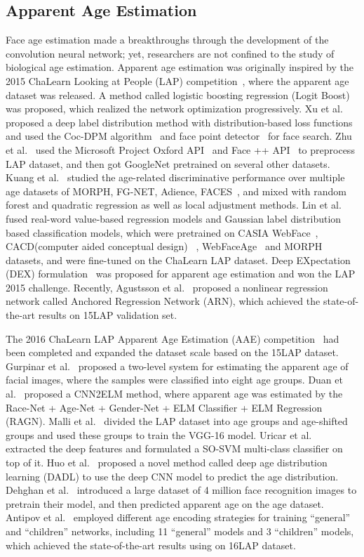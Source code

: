 \documentclass[journal]{IEEEtran}
\begin{document}
\subsection{Apparent Age Estimation}
Face age estimation made a breakthroughs through the development of the convolution neural network; yet, researchers are not confined to the study of biological age estimation. Apparent age estimation was originally inspired by the 2015 ChaLearn Looking at People (LAP) competition~\cite{ref-46}, where the apparent age dataset was released. A method called logistic boosting regression (Logit Boost)~\cite{ref-33} was proposed, which realized the network optimization progressively. Xu et al.~\cite{ref-34} proposed a deep label distribution method with distribution-based loss functions and used the Coc-DPM algorithm~\cite{ref-35} and face point detector~\cite{ref-36} for face search. Zhu et al.~\cite{ref-37} used the Microsoft Project Oxford API~\cite{ref-39} and Face ++ API~\cite{ref-38} to preprocess LAP dataset, and then got GoogleNet pretrained on several other datasets. Kuang et al.~\cite{ref-40} studied the age-related discriminative performance over multiple age datasets of MORPH, FG-NET, Adience, FACES~\cite{ref-41}, and mixed with random forest and quadratic regression as well as local adjustment methods. Lin et al.~\cite{ref-42} fused real-word value-based regression models and Gaussian label distribution based classification models, which were pretrained on CASIA WebFace~\cite{ref-43}, CACD(computer aided conceptual design) ~\cite{ref-44}, WebFaceAge~\cite{ref-45} and MORPH datasets, and were fine-tuned on the ChaLearn LAP dataset. Deep EXpectation (DEX) formulation~\cite{ref-47} was proposed for apparent age estimation and won the LAP 2015 challenge. Recently, Agustsson et al.~\cite{ref-48} proposed a nonlinear regression network called Anchored Regression Network (ARN), which achieved the state-of-the-art results on 15LAP validation set.
\par
The 2016 ChaLearn LAP Apparent Age Estimation (AAE) competition~\cite{ref-56} had been completed and expanded the dataset scale based on the 15LAP dataset. Gurpinar et al.~\cite{ref-49} proposed a two-level system for estimating the apparent age of facial images, where the samples were classified into eight age groups. Duan et al.~\cite{ref-50} proposed a CNN2ELM method, where apparent age was estimated by the Race-Net + Age-Net + Gender-Net + ELM Classifier + ELM Regression (RAGN). Malli et al.~\cite{ref-51} divided the LAP dataset into age groups and age-shifted groups and used these groups to train the VGG-16 model. Uricar et al.~\cite{ref-52} extracted the deep features and formulated a SO-SVM multi-class classifier on top of it. Huo et al.~\cite{ref-53} proposed a novel method called deep age distribution learning (DADL) to use the deep CNN model to predict the age distribution. Dehghan et al.~\cite{ref-54} introduced a large dataset of 4 million face recognition images to pretrain their model, and then predicted apparent age on the age dataset. Antipov et al.~\cite{ref-55} employed different age encoding strategies for training “general” and “children” networks, including 11 ``general'' models and 3 ``children'' models, which achieved the state-of-the-art results using on 16LAP dataset.
\end{document}
